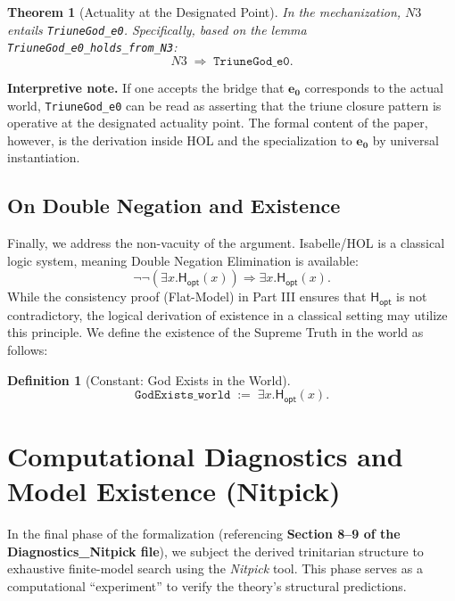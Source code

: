 \documentclass[a4paper, 11pt]{article}
\theoremstyle{plain}
\newtheorem{theorem}{Theorem}[section]
\theoremstyle{definition}
\newtheorem{definition}{Definition}[section]
\newcommand{\Hopt}{\mathsf{H_{opt}}}       %
\newcommand{\eZero}{\mathbf{e_0}}         %
\begin{document}
\begin{theorem}[Actuality at the Designated Point]
\label{thm:TriuneGod_e0}
In the mechanization, $N3$ entails \texttt{TriuneGod\_e0}. Specifically, based on the lemma \texttt{TriuneGod\_e0\_holds\_from\_N3}:
\[
N3 \;\Longrightarrow\; \texttt{TriuneGod\_e0}.
\]
\end{theorem}

\noindent\textbf{Interpretive note.}
If one accepts the bridge that $\eZero$ corresponds to the actual world, \texttt{TriuneGod\_e0} can be read as asserting that the triune closure pattern is operative at the designated actuality point. The formal content of the paper, however, is the derivation inside HOL and the specialization to $\eZero$ by universal instantiation.

\subsection{On Double Negation and Existence}

Finally, we address the non-vacuity of the argument. Isabelle/HOL is a classical logic system, meaning Double Negation Elimination is available:
\[
\neg\neg(\exists x.\Hopt(x)) \Longrightarrow \exists x.\Hopt(x).
\]
While the consistency proof (Flat-Model) in Part III ensures that $\Hopt$ is not contradictory, the logical derivation of existence in a classical setting may utilize this principle. We define the existence of the Supreme Truth in the world as follows:

\begin{definition}[Constant: God Exists in the World]
\[
\texttt{GodExists\_world}\;:=\;\exists x.\Hopt(x).
\]
\end{definition}

\newpage


\section{Computational Diagnostics and Model Existence (Nitpick)}
\label{sec:nitpick_analysis}

In the final phase of the formalization (referencing \textbf{Section 8--9 of the Diagnostics\_Nitpick file}), we subject the derived trinitarian structure to exhaustive finite-model search using the \textit{Nitpick} tool. This phase serves as a computational ``experiment'' to verify the theory's structural predictions.
\end{document}
